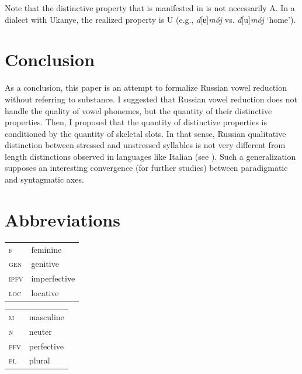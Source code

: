 \documentclass[output=paper,
modfonts,
newtxmath,
hidelinks,
]{langscibook}
\begin{document}
\noindent Note that the distinctive property that is manifested in  is not necessarily {\textbar}A{\textbar}. In a dialect with Ukanye, the realized property is {\textbar}U{\textbar} (e.g., \textit{d}[ɐ]\textit{mój} vs. \textit{d}[u]\textit{mój} ‘home’).

\section{Conclusion}\label{5:s5}

As a conclusion, this paper is an attempt to formalize Russian vowel reduction without referring to substance. I suggested that Russian vowel reduction does not handle the quality of vowel phonemes, but the quantity of their distinctive properties. Then, I proposed that the quantity of distinctive properties is conditioned by the quantity of skeletal slots. In that sense, Russian qualitative distinction between stressed and unstressed syllables is not very different from length distinctions observed in languages like Italian (see \citealt{Parmenter-Carman1932}). Such a generalization supposes an interesting convergence (for further studies) between paradigmatic and syntagmatic axes.


\section*{Abbreviations}

\begin{tabularx}{.5\textwidth}{@{}lQ@{}}
\textsc{f}&feminine\\
\textsc{gen}&genitive\\
\textsc{ipfv}&imperfective\\
\textsc{loc}&locative\\
\end{tabularx}%
\begin{tabularx}{.5\textwidth}{@{}lQ@{}}
\textsc{m}&masculine\\
\textsc{n}&neuter\\
\textsc{pfv}&perfective\\
\textsc{pl}&plural\\
\end{tabularx}

\sloppy
\printbibliography[heading=subbibliography,notkeyword=this]
\end{document}
